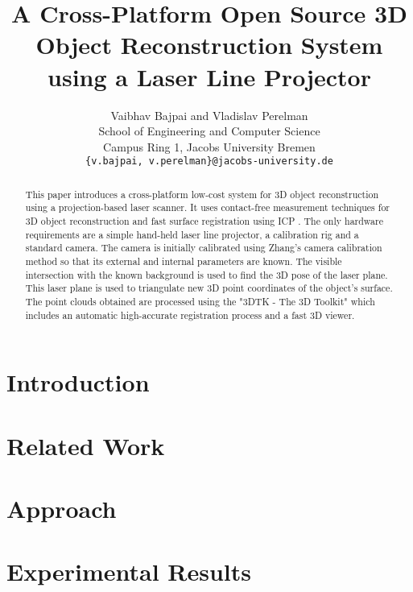 \documentclass[conference]{IEEEtran}
\begin{document}
\title{A Cross-Platform Open Source 3D Object Reconstruction System using
a Laser Line Projector}

\author{
  Vaibhav Bajpai and Vladislav Perelman \\
  School of Engineering and Computer Science\\
  Campus Ring 1, Jacobs University Bremen\\
  \texttt{\{v.bajpai, v.perelman\}@jacobs-university.de}
}

\maketitle

\begin{abstract} This paper introduces a cross-platform low-cost system for 3D
  object reconstruction using a projection-based laser scanner. It uses
  contact-free measurement techniques for 3D object reconstruction and fast
  surface registration using \ac{ICP} \cite{besl:1992}. The only hardware
  requirements are a simple hand-held laser line projector, a calibration rig
  and a standard camera. The camera is initially calibrated using Zhang's
  camera calibration method so that its external and internal parameters are
  known. The visible intersection with the known background is used to find
  the 3D pose of the laser plane. This laser plane is used to triangulate new
  3D point coordinates of the object's surface. The point clouds obtained are
  processed using the "3DTK - The 3D Toolkit" \cite{3dtk:2012} which includes
  an automatic high-accurate registration process and a fast 3D viewer.
\end{abstract}

\section{Introduction}
\label{section:introduction}


\section{Related Work}
\label{section:relatedwork}


\section{Approach}
\label{section:approach}


\section{Experimental Results}
\label{section:results}

\end{document}
